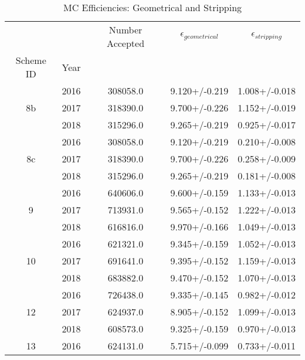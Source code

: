 \begin{table}
\centering
\caption{MC Efficiencies: Geometrical and Stripping}
\label{tab:genstrip_2}
\begin{tabular}{ccccc}
\toprule
   &      &  Number Accepted & $\epsilon_{geometrical}$ & $\epsilon_{stripping}$ \\
Scheme ID & Year &                  &                          &                        \\
\midrule
\multirow{3}{*}{8b} & 2016 &         308058.0 &            9.120+/-0.219 &          1.008+/-0.018 \\
   & 2017 &         318390.0 &            9.700+/-0.226 &          1.152+/-0.019 \\
   & 2018 &         315296.0 &            9.265+/-0.219 &          0.925+/-0.017 \\
\cline{1-5}
\multirow{3}{*}{8c} & 2016 &         308058.0 &            9.120+/-0.219 &          0.210+/-0.008 \\
   & 2017 &         318390.0 &            9.700+/-0.226 &          0.258+/-0.009 \\
   & 2018 &         315296.0 &            9.265+/-0.219 &          0.181+/-0.008 \\
\cline{1-5}
\multirow{3}{*}{9} & 2016 &         640606.0 &            9.600+/-0.159 &          1.133+/-0.013 \\
   & 2017 &         713931.0 &            9.565+/-0.152 &          1.222+/-0.013 \\
   & 2018 &         616816.0 &            9.970+/-0.166 &          1.049+/-0.013 \\
\cline{1-5}
\multirow{3}{*}{10} & 2016 &         621321.0 &            9.345+/-0.159 &          1.052+/-0.013 \\
   & 2017 &         691641.0 &            9.395+/-0.152 &          1.159+/-0.013 \\
   & 2018 &         683882.0 &            9.470+/-0.152 &          1.070+/-0.013 \\
\cline{1-5}
\multirow{3}{*}{12} & 2016 &         726438.0 &            9.335+/-0.145 &          0.982+/-0.012 \\
   & 2017 &         624937.0 &            8.905+/-0.152 &          1.099+/-0.013 \\
   & 2018 &         608573.0 &            9.325+/-0.159 &          0.970+/-0.013 \\
\cline{1-5}
\multirow{3}{*}{13} & 2016 &         624131.0 &            5.715+/-0.099 &          0.733+/-0.011 \\

\end{tabular}
\end{table}
